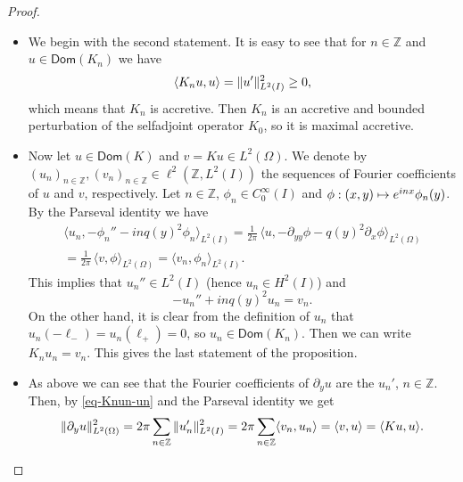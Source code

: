 \documentclass[10pt]{amsart}
\def\mto{\mathchoice{\longmapsto}{\mapsto}{\mapsto}{\mapsto}}
\theoremstyle{plain}
\theoremstyle{definition}
\newcommand{\nr}[1]{\Vert #1\Vert}
\newcommand{\binnp}[2]{\bigl\langle #1 , #2 \bigr\rangle}
\newcommand{\innps}[2]{\langle #1 , #2 \rangle}\let\innp\innps
\newcommand{\1}{\mathds 1}
\let\Re\relax
\DeclareMathOperator{\Re}{\mathsf{Re}\mkern2mu}
\newcommand{\Dom}{\mathsf{Dom}}
\newcommand{\Z}{\mathbb{Z}}
\let\vf\phi
\let\O\Omega
\begin{document}
\skpt
\begin{proof}
\begin{itemize}
\item
We begin with the second statement. It is easy to see that for $n \in \Z$ and $u \in \Dom(K_n)$ we have
\begin{equation} \label{eq-Knun-un}
\Re \innp{K_n u}{u} = \nr{u'}_{L^2(I)}^2 \geq 0,
\end{equation}
which means that $K_n$ is accretive. Then $K_n$ is an accretive and bounded perturbation of the selfadjoint operator $K_0$, so it is maximal accretive.

\item
Now let $u \in \Dom(K)$ and $v = Ku \in L^2(\O)$. We denote by $(u_n)_{n \in \Z}, (v_n)_{n \in \Z} \in \ell^2(\Z,L^2(I))$ the sequences of Fourier coefficients of $u$ and $v$, respectively. Let $n \in \Z$, $\vf_n \in C_0^\infty(I)$ and $\vf : (x,y) \mto e^{inx} \vf_n(y)$. By the Parseval identity we have
\begin{multline*}
\innp{u_n}{-\vf_n'' - in q(y)^2 \vf_n}_{L^2(I)}
= \frac 1 {2\pi}\, \binnp{u}{-\partial_{yy} \vf - q(y)^2 \partial_x \vf}_{L^2(\O)}\\
= \frac 1 {2\pi}\, \innp{v}{\vf}_{L^2(\O)} = \innp{v_n}{\vf_n}_{L^2(I)}.
\end{multline*}
This implies that $u_n'' \in L^2(I)$ (hence $u_n \in H^2(I)$) and
\[
-u_n'' + in q(y)^2 u_n = v_n.
\]
On the other hand, it is clear from the definition of $u_n$ that $u_n(-\ell_-) = u_n(\ell_+) = 0$, so $u_n \in \Dom(K_n)$. Then we can write $K_n u_n = v_n$. This gives the last statement of the proposition.

\item
As above we can see that the Fourier coefficients of $\partial_y u$ are the $u_n'$, $n \in \Z$. Then, by \eqref{eq-Knun-un} and the Parseval identity we get
\begin{equation} \label{eq-K-accretive}
\nr{\partial_y u }_{L^2(\O)}^2 = 2\pi \sum_{n \in \Z} \nr{u_n'}_{L^2(I)}^2 = 2\pi \Re \sum_{n \in \Z} \innp{v_n}{u_n} = \Re \innp{v}{u} = \Re \innps{Ku}{u}.
\end{equation}


\end{itemize}
\end{proof}
\end{document}
